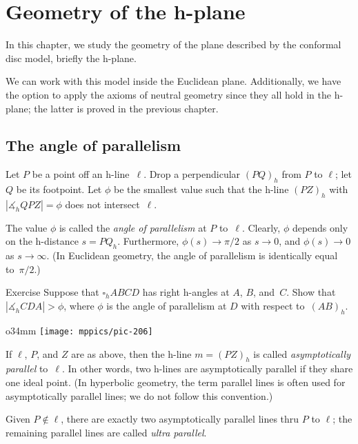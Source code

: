 \chapter{Geometry of the h-plane}\label{chap:h-plane}

In this chapter, we study the geometry of the plane described by the conformal disc model, briefly the h-plane.

We can work with this model inside the Euclidean plane. 
Additionally, we have the option to apply the axioms of neutral geometry since they all hold in the h-plane; the latter is proved in the previous chapter.

\section{The angle of parallelism}

Let $P$ be a point off an h-line~$\ell$. 
Drop a perpendicular $(PQ)_h$ from $P$ to $\ell$;
let $Q$ be its footpoint.
Let $\phi$ be the smallest value such that the h-line $(PZ)_h$ with $|\measuredangle_h Q P Z|=\phi$ does not intersect~$\ell$.

The value $\phi$ is called the \emph{angle of parallelism} at $P$ to~$\ell$.
Clearly, $\phi$ depends only on the h-distance $s=PQ_h$.
Furthermore, $\phi(s)\to \pi/2$ as $s\to 0$, 
and $\phi(s)\to0$ as $s\to\infty$.
(In Euclidean geometry, the angle of parallelism is identically equal to~$\pi/2$.)

\begin{thm}{Exercise}\label{ex:lambert-parallelism}
Suppose that $\square_hABCD$ has right h-angles at $A$, $B$, and~$C$.
Show that $|\measuredangle_h CDA|>\phi$, where $\phi$ is the angle of parallelism at $D$ with respect to~$(AB)_h$.
\end{thm}

\begin{wrapfigure}{o}{34mm}
\vskip-3mm
\centering
\texttt{[image: mppics/pic-206]}
\end{wrapfigure}

If $\ell$, $P$, and $Z$ are as above, then the h-line $m=(PZ)_h$ is called \emph{asymptotically parallel} to~$\ell$.
In other words, two h-lines are asymptotically parallel if they share one ideal point.
(In hyperbolic geometry, the term parallel lines is often used for asymptotically parallel lines; we do not follow this convention.)

Given $P\not\in\ell$, there are exactly two asymptotically parallel lines thru $P$ to $\ell$; 
the remaining parallel lines are called \emph{ultra parallel}.



